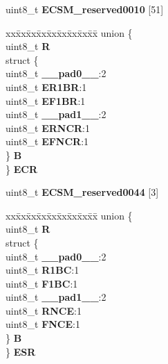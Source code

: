 \begin{DoxyCompactItemize}
\begin{tabbing}
\end{tabbing}\item 
\mbox{\label{structECSM__tag_a52f81f9ef04d0cad6ff8cf11ffc64c96}} 
uint8\+\_\+t {\bfseries E\+C\+S\+M\+\_\+reserved0010} \mbox{[}51\mbox{]}
\item 
\mbox{\label{structECSM__tag_a516922d42d20541b4754ddc0da48fe95}} 
\begin{tabbing}
xx\=xx\=xx\=xx\=xx\=xx\=xx\=xx\=xx\=\kill
union \{\\
\>uint8\_t {\bfseries R}\\
\>struct \{\\
\>\>uint8\_t {\bfseries \_\_pad0\_\_}:2\\
\>\>uint8\_t {\bfseries ER1BR}:1\\
\>\>uint8\_t {\bfseries EF1BR}:1\\
\>\>uint8\_t {\bfseries \_\_pad1\_\_}:2\\
\>\>uint8\_t {\bfseries ERNCR}:1\\
\>\>uint8\_t {\bfseries EFNCR}:1\\
\>\} {\bfseries B}\\
\} {\bfseries ECR}\\

\end{tabbing}\item 
\mbox{\label{structECSM__tag_a13e3c6a7ae45db77509710530641e4db}} 
uint8\+\_\+t {\bfseries E\+C\+S\+M\+\_\+reserved0044} \mbox{[}3\mbox{]}
\item 
\mbox{\label{structECSM__tag_a0804cab7b8966c775a3c37cac57a5fdd}} 
\begin{tabbing}
xx\=xx\=xx\=xx\=xx\=xx\=xx\=xx\=xx\=\kill
union \{\\
\>uint8\_t {\bfseries R}\\
\>struct \{\\
\>\>uint8\_t {\bfseries \_\_pad0\_\_}:2\\
\>\>uint8\_t {\bfseries R1BC}:1\\
\>\>uint8\_t {\bfseries F1BC}:1\\
\>\>uint8\_t {\bfseries \_\_pad1\_\_}:2\\
\>\>uint8\_t {\bfseries RNCE}:1\\
\>\>uint8\_t {\bfseries FNCE}:1\\
\>\} {\bfseries B}\\
\} {\bfseries ESR}\\


\end{tabbing}
\end{DoxyCompactItemize}
